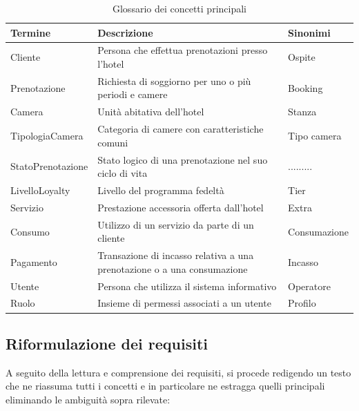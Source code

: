 \documentclass[a4paper,12pt]{report}
\begin{document}
\begin{table}[h]
    \centering
    \begin{tabular}{|l|p{7cm}|l|}
        \hline
        \rowcolor{headerblue}
        \textbf{Termine}  & \textbf{Descrizione}                                                    & \textbf{Sinonimi} \\
        \hline
        Cliente           & Persona che effettua prenotazioni presso l’hotel                        & Ospite            \\
        Prenotazione      & Richiesta di soggiorno per uno o più periodi e camere                   & Booking           \\
        Camera            & Unità abitativa dell’hotel                                              & Stanza            \\
        TipologiaCamera   & Categoria di camere con caratteristiche comuni                          & Tipo camera       \\
        StatoPrenotazione & Stato logico di una prenotazione nel suo ciclo di vita                  & .........         \\
        LivelloLoyalty    & Livello del programma fedeltà                                           & Tier              \\
        Servizio          & Prestazione accessoria offerta dall’hotel                               & Extra             \\
        Consumo           & Utilizzo di un servizio da parte di un cliente                          & Consumazione      \\
        Pagamento         & Transazione di incasso relativa a una prenotazione o a una consumazione & Incasso           \\
        Utente            & Persona che utilizza il sistema informativo                             & Operatore         \\
        Ruolo             & Insieme di permessi associati a un utente                               & Profilo           \\
        \hline
    \end{tabular}
    \caption{Glossario dei concetti principali}
\end{table}

\subsection{Riformulazione dei requisiti}
A seguito della lettura e comprensione dei requisiti, si procede redigendo un testo che ne
riassuma tutti i concetti e in particolare ne estragga quelli principali eliminando le ambiguità
sopra rilevate:
\vspace{8mm}
\end{document}
